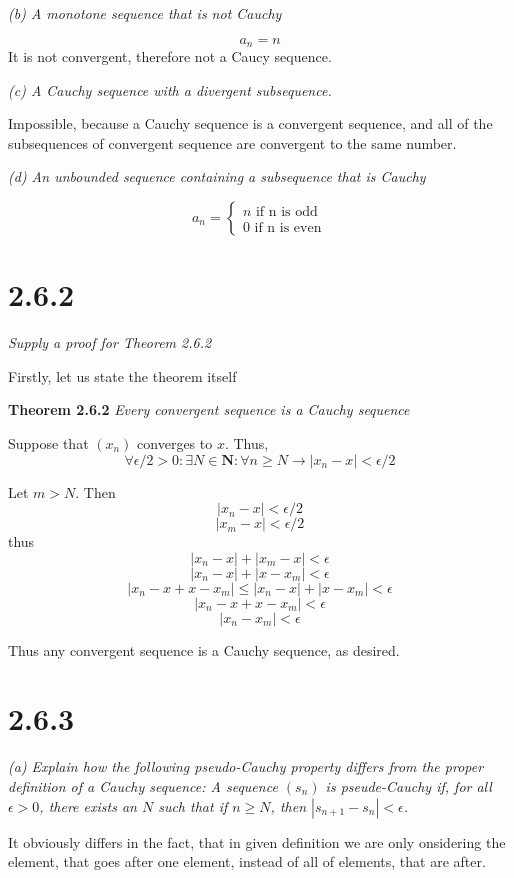 \documentclass[11pt,oneside,titlepage]{article}
\begin{document}
\textit{(b) A monotone sequence that is not Cauchy}

$$a_n = n$$
It is not convergent, therefore not a Caucy sequence.

\textit{(c) A Cauchy sequence with a divergent subsequence.}

Impossible, because a Cauchy sequence is a convergent sequence, and
all of the subsequences of convergent sequence are convergent to the
same number.

\textit{(d) An unbounded sequence containing a subsequence that is Cauchy}

\begin{equation}
  a_n =
  \begin{cases}
    n \text{ if n is odd } \\
    0 \text{ if n is even}
  \end{cases}
\end{equation}

\section*{2.6.2}
\textit{Supply a proof for Theorem 2.6.2}

Firstly, let us state the theorem itself

\textbf{Theorem 2.6.2}
\textit{Every convergent sequence is a Cauchy sequence}

Suppose that $(x_n)$ converges to $x$. Thus,
$$\forall \epsilon/2 > 0: \exists N \in \textbf{N}: \forall n \geq N \to
|x_n - x| < \epsilon/2$$

Let $m > N$. Then
$$|x_n - x| < \epsilon/2$$
$$|x_m - x| < \epsilon/2$$
thus
$$|x_n - x| + |x_m - x| < \epsilon$$
$$|x_n - x| + |x - x_m| < \epsilon$$
$$|x_n - x + x - x_m| \leq |x_n - x| + |x - x_m| < \epsilon$$
$$|x_n - x + x - x_m| < \epsilon$$
$$|x_n - x_m| < \epsilon$$

Thus any convergent sequence is a Cauchy sequence, as desired.

\section*{2.6.3}
\textit{(a) Explain how the following pseudo-Cauchy property differs
  from the proper definition of a Cauchy sequence: A sequence $(s_n)$ is
  pseude-Cauchy if, for all $\epsilon > 0$, there exists an $N$ such that
  if $n \geq N$, then $|s_{n + 1} - s_n| < \epsilon$.}

It obviously differs in the fact, that in given definition we are only
onsidering the element, that goes after one element, instead of
all of elements, that are after.
\end{document}
